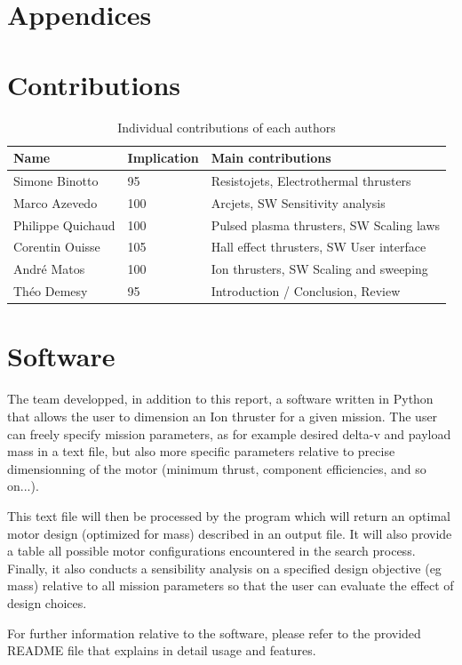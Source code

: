 \section*{Appendices}

\section{Contributions}

\begin{table}[H]
\centering
\caption{Individual contributions of each authors}
\label{tab:contributions}
\begin{tabular}{@{}lll@{}}
\toprule
\textbf{Name} & \textbf{Implication} & \textbf{Main contributions} \\ \midrule
Simone Binotto & 95 & Resistojets, Electrothermal thrusters\\
Marco Azevedo & 100 & Arcjets, SW Sensitivity analysis \\
Philippe Quichaud & 100 & Pulsed plasma thrusters, SW Scaling laws \\
Corentin Ouisse & 105 & Hall effect thrusters, SW User interface  \\
Andr\'{e} Matos & 100 & Ion thrusters, SW Scaling and sweeping \\
Th\'{e}o Demesy & 95 & Introduction / Conclusion, Review \\ \bottomrule
\end{tabular}
\end{table}

\section{Software}

The team developped, in addition to this report, a software written in Python that allows the user to dimension an Ion thruster for a given mission. The user can freely specify mission parameters, as for example desired delta-v and payload mass in a text file, but also more specific parameters relative to precise dimensionning of the motor (minimum thrust, component efficiencies, and so on...).

This text file will then be processed by the program which will return an optimal motor design (optimized for mass) described in an output file. It will also provide a table all possible motor configurations encountered in the search process. Finally, it also conducts a sensibility analysis on a specified design objective (eg mass) relative to all mission parameters so that the user can evaluate the effect of design choices.

For further information relative to the software, please refer to the provided README file that explains in detail usage and features.